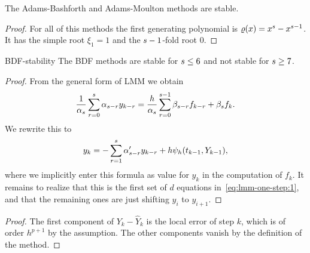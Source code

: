 \begin{corollary}
  The Adams-Bashforth and Adams-Moulton methods are stable.
\end{corollary}

\begin{proof}
  For all of this methods the first generating polynomial is $\varrho(x)
  = x^s-x^{s-1}$. It has the simple root $\xi_1 = 1$ and the
  $s-1$-fold root 0.
\end{proof}

\begin{Theorem}{BDF-stability}
  The BDF methods are stable for $s \le 6$ and not
  stable for $s \ge 7$.
\end{Theorem}




\begin{proof}
  From the general form of LMM we
  obtain
  \begin{gather*}
    \frac1{\alpha_s} \sum_{r=0}^s \alpha_{s-r} y_{k-r}
    = \frac{h}{\alpha_s} \sum_{r=0}^{s-1} \beta_{s-r} f_{k-r}
    + \beta_s f_k.
  \end{gather*}
  We rewrite this to
  \begin{gather*}
    y_k = -\sum_{r=1}^{s} \alpha'_{s-r} y_{k-r} +
    h\psi_h(t_{k-1}, Y_{k-1}),
  \end{gather*}
  where we implicitly enter this formula as value for $y_k$ in the
  computation of $f_k$. It remains to realize that this is the first
  set of $d$ equations in~\eqref{eq:lmm-one-step:1}, and that the
  remaining ones are just shifting $y_i$ to $y_{i+1}$.
\end{proof}



\begin{proof}
  The first component of $Y_k - \widehat Y_k$ is the local error of
  step $k$, which is of order $h^{p+1}$ by the assumption. The other
  components vanish by the definition of the method.
\end{proof}



